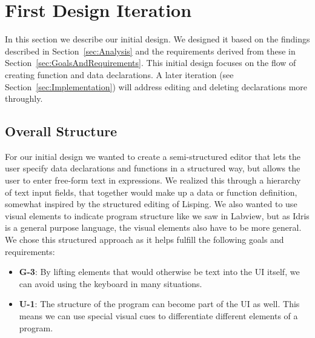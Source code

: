 \chapter{First Design Iteration}
\label{sec:InitialDesign}

In this section we describe our initial design. 
We designed it based on the findings described in Section~\ref{sec:Analysis} and the requirements derived from these in Section~\ref{sec:GoalsAndRequirements}.
This initial design focuses on the flow of creating function and data declarations. A later iteration (see Section~\ref{sec:Implementation}) will address editing and deleting declarations more throughly.

\section{Overall Structure}
For our initial design we wanted to create a semi-structured editor that lets the user specify data declarations and functions in a structured way, but allows the user to enter free-form text in expressions.
We realized this through a hierarchy of text input fields, that together would make up a data or function definition, somewhat inspired by the structured editing of Lisping.
We also wanted to use visual elements to indicate program structure like we saw in Labview, but as Idris is a general purpose language, the visual elements also have to be more general.
We chose this structured approach as it helps fulfill the following goals and requirements:
\begin{itemize}
	\item \textbf{G-3}: By lifting elements that would otherwise be text into the UI itself, we can avoid using the keyboard in many situations.
	\item \textbf{U-1}: The structure of the program can become part of the UI as well. 
	This means we can use special visual cues to differentiate different elements of a program. 
\end{itemize}


